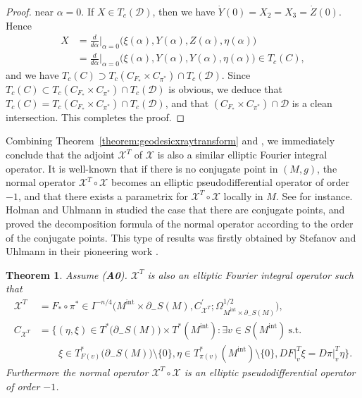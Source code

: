\documentclass[a4paper,11pt,reqno]{amsart}
\numberwithin{equation}{section}
\newtheorem{theorem}{Theorem}[section]
\theoremstyle{definition}
\theoremstyle{remark}
\begin{document}
\begin{proof}
%
%
near $\alpha=0$. If $X \in T_c(\mathcal{D})$, then we have $\dot{Y}(0)=X_2=X_3=\dot{Z}(0)$. Hence 
%
%
\begin{align*}
  X
& =
  \frac{d}{d\alpha}\bigg\vert_{\alpha=0}
  \bigl(\xi(\alpha),Y(\alpha),Z(\alpha),\eta(\alpha)\bigr)
\\
& =
  \frac{d}{d\alpha}\bigg\vert_{\alpha=0}
  \bigl(\xi(\alpha),Y(\alpha),Y(\alpha),\eta(\alpha)\bigr)
  \in 
  T_c(C), 
\end{align*}
%
%
and we have $T_c(C) \supset T_c(C_{F_\ast}{\times}C_{\pi^\ast}){\cap}T_c(\mathcal{D})$. 
Since $T_c(C) \subset T_c(C_{F_\ast}{\times}C_{\pi^\ast}){\cap}T_c(\mathcal{D})$ is obvious, 
we deduce that $T_c(C) = T_c(C_{F_\ast}{\times}C_{\pi^\ast}){\cap}T_c(\mathcal{D})$, and that 
$(C_{F_\ast}{\times}C_{\pi^\ast}){\cap}\mathcal{D}$ is a clean intersection. This completes the proof.
\end{proof}
%
%
Combining Theorem~\ref{theorem:geodesicxraytransform} and \cite[Theorem~25.2.2]{Hoermander4},  
we immediately conclude that the adjoint $\mathcal{X}^T$ of $\mathcal{X}$ is also a similar elliptic Fourier integral operator. 
It is well-known that if there is no conjugate point in $(M,g)$, 
the normal operator $\mathcal{X}^T\circ\mathcal{X}$ becomes an elliptic pseudodifferential operator of order $-1$, 
and that there exists a parametrix for 
$\mathcal{X}^T\circ\mathcal{X}$ locally in $M$. 
See \cite{GuilleminSternberg, HolmanUhlmann} for instance.  
Holman and Uhlmann in \cite{HolmanUhlmann} studied the case that there are conjugate points, 
and proved the decomposition formula of the normal operator according to the order of the conjugate points. This type of results was firstly obtained by Stefanov and Uhlmann in their pioneering work \cite{PlamenGunther}. 
%
%
\begin{theorem}
\label{theorem:adointofgeodesicxraytransform} 
Assume {\rm ({\bf A0})}. 
$\mathcal{X}^T$ is also an elliptic Fourier integral operator such that 
%
%
\begin{align*}
  \mathcal{X}^T
& =
  F_\ast{\circ}\pi^\ast
  \in
  I^{-n/4}
  \bigl(
  M^\text{int}\times\partial_-S(M),
  C_{\mathcal{X}^T}^\prime;
  \Omega_{M^\text{int}\times\partial_-S(M)}^{1/2}
  \bigr),
\\
  C_{\mathcal{X}^T}
& =
  \bigl\{
  (\eta,\xi) 
  \in 
  T^\ast\bigl(\partial_-S(M)\bigr){\times}T^\ast(M^\text{int}): 
  \exists v \in S(M^\text{int})\ \text{s.t.}\ 
\\
& \qquad 
  \xi \in T^\ast_{F(v)}\bigl(\partial_-S(M)\bigr)\setminus\{0\}, 
  \eta \in T^\ast_{\pi(v)}(M^\text{int})\setminus\{0\}, 
  DF\vert^T_v\xi=D\pi\vert^T_v\eta
  \bigr\}.
\end{align*}
%
%
Furthermore the normal operator $\mathcal{X}^T\circ\mathcal{X}$ is an elliptic pseudodifferential operator of order $-1$. 
\end{theorem}
%
%  
\end{document}
